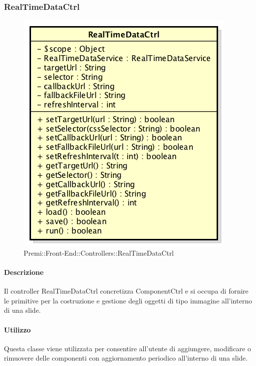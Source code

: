 \newpage
\subsubsection{RealTimeDataCtrl}
\begin{figure}[h]
	\centering
	\includegraphics[width=0.5\linewidth]{img/premi_front_end_controllers_realtimedatactrl}
	\caption[Premi::Front-End::Controllers::RealTimeDataCtrl]{Premi::Front-End::Controllers::RealTimeDataCtrl}
\end{figure}
   \paragraph{Descrizione}
	Il controller RealTimeDataCtrl concretizza ComponentCtrl e si occupa di fornire le primitive per la costruzione e gestione degli oggetti di tipo immagine all'interno di una slide.
		
	\paragraph{Utilizzo}
	Questa classe viene utilizzata per consentire all'utente di aggiungere, modificare o rimuovere delle componenti con aggiornamento periodico all'interno di una slide.
	
